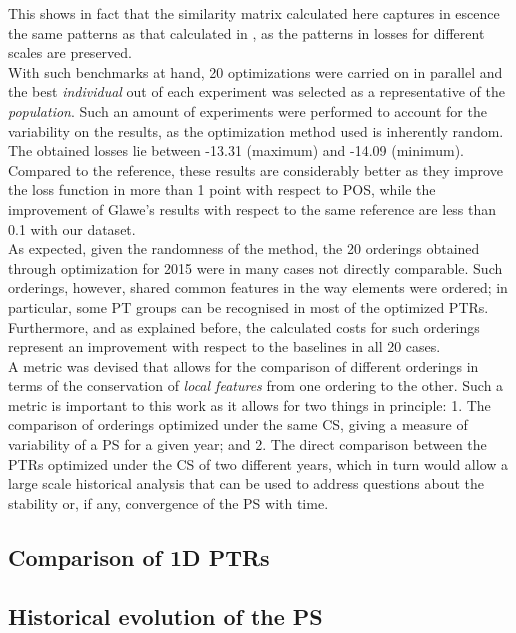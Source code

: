\documentclass[article]{article}
\begin{document}
This shows in fact that the similarity matrix calculated here captures in escence the same patterns as that calculated in \cite{Glawe_2016}, as the patterns in losses for different scales are preserved.\\

With such benchmarks at hand, 20 optimizations were carried on in parallel and the best \textit{individual} out of each experiment was selected as a representative of the \textit{population}. Such an amount of experiments were performed to account for the variability on the results, as the optimization method used is inherently random. The obtained losses lie between -13.31 (maximum) and -14.09 (minimum). Compared to the reference, these results are considerably better as they improve the loss function in more than 1 point with respect to POS, while the improvement of Glawe's results with respect to the same reference are less than 0.1 with our dataset. \\

As expected, given the randomness of the method, the 20 orderings obtained through optimization for 2015 were in many cases not directly comparable. Such orderings, however, shared common features in the way elements were ordered; in particular, some PT groups can be recognised in most of the optimized PTRs. Furthermore, and as explained before, the calculated costs for such orderings represent an improvement with respect to the baselines in all 20 cases. \\

A metric was devised that allows for the comparison of different orderings in terms of the conservation of \textit{local features} from one ordering to the other. Such a metric is important to this work as it allows for two things in principle: 1. The comparison of orderings optimized under the same CS, giving a measure of variability of a PS for a given year; and 2. The direct comparison between the PTRs optimized under the CS of two different years, which in turn would allow a large scale historical analysis that can be used to address questions about the stability or, if any, convergence of the PS with time. \\

\subsection{Comparison of 1D PTRs}

\equiv
\subsection{Historical evolution of the PS}
\end{document}
